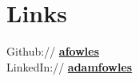 \documentclass[letterpaper]{fowles-resume} %
\begin{document}
\begin{minipage}[t]{0.33\textwidth}


\sectionspace %


\section{Links} 

Github:// \href{https://github.com/afowles}{\bf afowles} \\
LinkedIn:// \href{https://www.linkedin.com/in/adamfowles}{\bf adamfowles} \\



\end{minipage} %
\hfill
%
%
\end{document}
